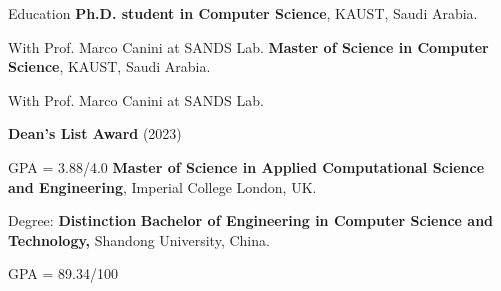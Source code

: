\begin{rubric}{Education}
%
	\textbf{Ph.D. student in Computer Science}, KAUST, Saudi Arabia.
	\par With Prof. Marco Canini at SANDS Lab.
%
%
	\textbf{Master of Science in Computer Science}, KAUST, Saudi Arabia.
	\par With Prof. Marco Canini at SANDS Lab.
	\par \textbf{Dean's List Award} (2023)
	\par GPA = 3.88/4.0
% 
%
	\textbf{Master of Science in Applied Computational Science and Engineering}, Imperial College London, UK.
	\par Degree: \textbf{Distinction}
%
	\textbf{Bachelor of Engineering in Computer Science and Technology,} Shandong University, China.
	\par GPA = 89.34/100
\end{rubric}